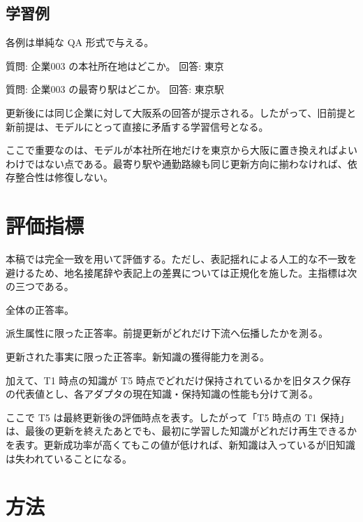 \documentclass[12pt,a4paper]{article}
\begin{document}
\subsection{学習例}\label{ux5b66ux7fd2ux4f8b}

各例は単純な QA 形式で与える。

質問: 企業003 の本社所在地はどこか。 回答: 東京

質問: 企業003 の最寄り駅はどこか。 回答: 東京駅

更新後には同じ企業に対して大阪系の回答が提示される。したがって、旧前提と新前提は、モデルにとって直接に矛盾する学習信号となる。

ここで重要なのは、モデルが本社所在地だけを東京から大阪に置き換えればよいわけではない点である。最寄り駅や通勤路線も同じ更新方向に揃わなければ、依存整合性は修復しない。

\section{評価指標}\label{ux8a55ux4fa1ux6307ux6a19}

本稿では完全一致を用いて評価する。ただし、表記揺れによる人工的な不一致を避けるため、地名接尾辞や表記上の差異については正規化を施した。主指標は次の三つである。

\begin{definition}[全体正答率]
全体の正答率。
\end{definition}

\begin{definition}[依存整合性 $(DC)$]
派生属性に限った正答率。前提更新がどれだけ下流へ伝播したかを測る。
\end{definition}

\begin{definition}[更新成功率]
更新された事実に限った正答率。新知識の獲得能力を測る。
\end{definition}

加えて、T1 時点の知識が T5 時点でどれだけ保持されているかを旧タスク保存の代表値とし、各アダプタの現在知識・保持知識の性能も分けて測る。

ここで T5 は最終更新後の評価時点を表す。したがって「T5 時点の T1 保持」は、最後の更新を終えたあとでも、最初に学習した知識がどれだけ再生できるかを表す。更新成功率が高くてもこの値が低ければ、新知識は入っているが旧知識は失われていることになる。

\section{方法}\label{ux65b9ux6cd5}
\end{document}
